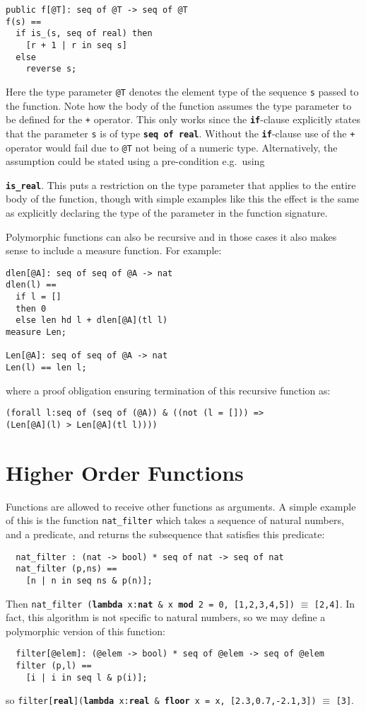 \documentclass{overturerepchap}
\newcommand{\keyw}[1]{{\bf\ttfamily #1}}
\begin{document}
\begin{lstlisting}
public f[@T]: seq of @T -> seq of @T
f(s) ==
  if is_(s, seq of real) then
  	[r + 1 | r in seq s]
  else
  	reverse s;
\end{lstlisting}

Here the type parameter \texttt{@T} denotes the element type of the sequence \texttt{s} passed to the function. Note how the body of the function assumes the type parameter to be defined for the \texttt{+} operator. This only works since the \texttt{\textbf{if}}-clause explicitly states that the parameter \texttt{s} is of type \texttt{\textbf{seq of real}}. Without the \texttt{\textbf{if}}-clause use of the \texttt{+} operator would fail due to \texttt{@T} not being of a numeric type. Alternatively, the assumption could be stated using a pre-condition e.g.\ using {\texttt{\keyw{is\_real}}. This puts a restriction on the type parameter that applies to the entire body of the function, though with simple examples like this the effect is the same as explicitly declaring the type of the parameter in the function signature.

Polymorphic functions can also be recursive and in those cases it also makes sense to include a measure function. For example:

\begin{lstlisting}
dlen[@A]: seq of seq of @A -> nat
dlen(l) ==
  if l = []
  then 0
  else len hd l + dlen[@A](tl l)
measure Len;

Len[@A]: seq of seq of @A -> nat
Len(l) == len l;
\end{lstlisting}
\noindent where a proof obligation ensuring termination of this recursive function as:

\begin{lstlisting}
(forall l:seq of (seq of (@A)) & ((not (l = [])) => 
(Len[@A](l) > Len[@A](tl l))))
\end{lstlisting}

\section{Higher Order Functions}

Functions are allowed to receive other functions as arguments. A
simple example of this is the function \texttt{nat\_filter} which
takes a sequence of natural numbers, and a predicate, and returns the
subsequence that satisfies this predicate:
\begin{lstlisting}
  nat_filter : (nat -> bool) * seq of nat -> seq of nat
  nat_filter (p,ns) ==
    [n | n in seq ns & p(n)];
\end{lstlisting}
Then
  \texttt{nat\_filter (\keyw{lambda} x:\keyw{nat} \& x \keyw{mod} 2 = 0, [1,2,3,4,5])} $\equiv$ \texttt{[2,4]}.
In fact, this algorithm is not specific to natural numbers, so we may
define a polymorphic version of this function:
\begin{lstlisting}
  filter[@elem]: (@elem -> bool) * seq of @elem -> seq of @elem
  filter (p,l) ==
    [i | i in seq l & p(i)];
\end{lstlisting}
\label{filterdef}
so \texttt{filter[\keyw{real}](\keyw{lambda} x:\keyw{real} \&
  \keyw{floor} x = x, [2.3,0.7,-2.1,3])} $\equiv$  \texttt{[3]}.

}
\end{document}
